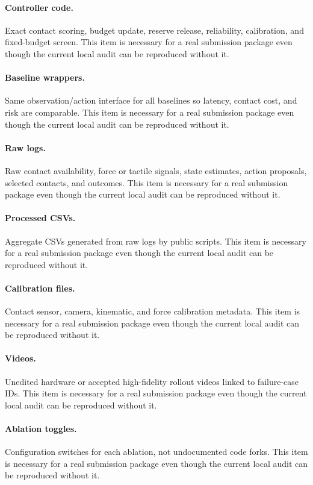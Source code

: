\documentclass{article}
\begin{document}
\paragraph{Controller code.} Exact contact scoring, budget update, reserve release, reliability, calibration, and fixed-budget screen. This item is necessary for a real submission package even though the current local audit can be reproduced without it.
\paragraph{Baseline wrappers.} Same observation/action interface for all baselines so latency, contact cost, and risk are comparable. This item is necessary for a real submission package even though the current local audit can be reproduced without it.
\paragraph{Raw logs.} Raw contact availability, force or tactile signals, state estimates, action proposals, selected contacts, and outcomes. This item is necessary for a real submission package even though the current local audit can be reproduced without it.
\paragraph{Processed CSVs.} Aggregate CSVs generated from raw logs by public scripts. This item is necessary for a real submission package even though the current local audit can be reproduced without it.
\paragraph{Calibration files.} Contact sensor, camera, kinematic, and force calibration metadata. This item is necessary for a real submission package even though the current local audit can be reproduced without it.
\paragraph{Videos.} Unedited hardware or accepted high-fidelity rollout videos linked to failure-case IDs. This item is necessary for a real submission package even though the current local audit can be reproduced without it.
\paragraph{Ablation toggles.} Configuration switches for each ablation, not undocumented code forks. This item is necessary for a real submission package even though the current local audit can be reproduced without it.
\end{document}

